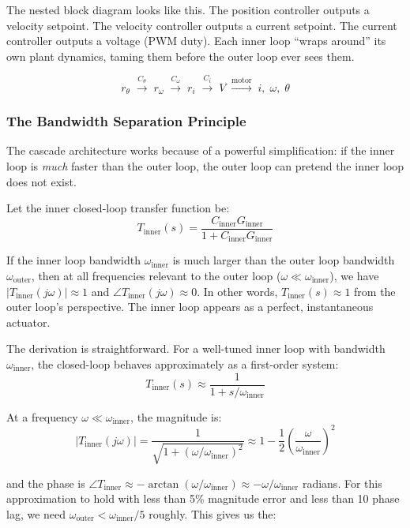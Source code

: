The nested block diagram looks like this. The position controller outputs a velocity setpoint. The velocity controller outputs a current setpoint. The current controller outputs a voltage (PWM duty). Each inner loop ``wraps around'' its own plant dynamics, taming them before the outer loop ever sees them.

\begin{equation}
r_\theta \;\xrightarrow{C_\theta}\; r_\omega \;\xrightarrow{C_\omega}\; r_i \;\xrightarrow{C_i}\; V \;\xrightarrow{\text{motor}}\; i,\;\omega,\;\theta
\end{equation}

\subsubsection{The Bandwidth Separation Principle}

The cascade architecture works because of a powerful simplification: if the inner loop is \textit{much} faster than the outer loop, the outer loop can pretend the inner loop does not exist.

Let the inner closed-loop transfer function be:
\begin{equation}
T_{\text{inner}}(s) = \frac{C_{\text{inner}} G_{\text{inner}}}{1 + C_{\text{inner}} G_{\text{inner}}}
\end{equation}

If the inner loop bandwidth $\omega_{\text{inner}}$ is much larger than the outer loop bandwidth $\omega_{\text{outer}}$, then at all frequencies relevant to the outer loop ($\omega \ll \omega_{\text{inner}}$), we have $|T_{\text{inner}}(j\omega)| \approx 1$ and $\angle T_{\text{inner}}(j\omega) \approx 0$. In other words, $T_{\text{inner}}(s) \approx 1$ from the outer loop's perspective. The inner loop appears as a perfect, instantaneous actuator.

The derivation is straightforward. For a well-tuned inner loop with bandwidth $\omega_{\text{inner}}$, the closed-loop behaves approximately as a first-order system:
\begin{equation}
T_{\text{inner}}(s) \approx \frac{1}{1 + s/\omega_{\text{inner}}}
\end{equation}

At a frequency $\omega \ll \omega_{\text{inner}}$, the magnitude is:
\[
|T_{\text{inner}}(j\omega)| = \frac{1}{\sqrt{1 + (\omega/\omega_{\text{inner}})^2}} \approx 1 - \frac{1}{2}\left(\frac{\omega}{\omega_{\text{inner}}}\right)^2
\]

and the phase is $\angle T_{\text{inner}} \approx -\arctan(\omega/\omega_{\text{inner}}) \approx -\omega/\omega_{\text{inner}}$ radians. For this approximation to hold with less than 5\% magnitude error and less than 10\textdegree{} phase lag, we need $\omega_{\text{outer}} < \omega_{\text{inner}} / 5$ roughly. This gives us the:

